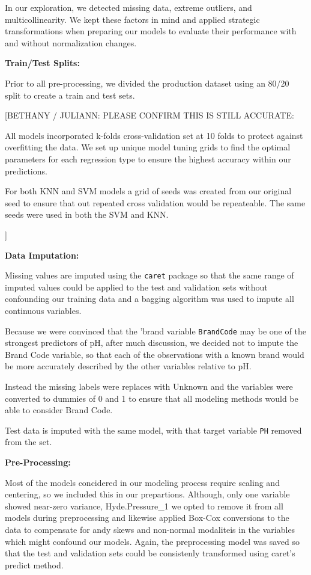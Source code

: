 \documentclass[]{report}
\begin{document}
In our exploration, we detected missing data, extreme outliers, and
multicollinearity. We kept these factors in mind and applied strategic
transformations when preparing our models to evaluate their performance
with and without normalization changes.

\textbf{Train/Test Splits:}

Prior to all pre-processing, we divided the production dataset using an
80/20 split to create a train and test sets.

{[}BETHANY / JULIANN: PLEASE CONFIRM THIS IS STILL ACCURATE:

All models incorporated k-folds cross-validation set at 10 folds to
protect against overfitting the data. We set up unique model tuning
grids to find the optimal parameters for each regression type to ensure
the highest accuracy within our predictions.

For both KNN and SVM models a grid of seeds was created from our
original seed to ensure that out repeated cross validation would be
repeateable. The same seeds were used in both the SVM and KNN.

{]}

\textbf{Data Imputation:}

Missing values are imputed using the \texttt{caret} package so that the
same range of imputed values could be applied to the test and validation
sets without confounding our training data and a bagging algorithm was
used to impute all continuous variables.

Because we were convinced that the 'brand variable \texttt{BrandCode}
may be one of the strongest predictors of pH, after much discussion, we
decided not to impute the Brand Code variable, so that each of the
observations with a known brand would be more accurately described by
the other variables relative to pH.

Instead the missing labels were replaces with Unknown and the variables
were converted to dummies of 0 and 1 to ensure that all modeling methods
would be able to consider Brand Code.

Test data is imputed with the same model, with that target variable
\texttt{PH} removed from the set.

\textbf{Pre-Processing:}

Most of the models concidered in our modeling process require scaling
and centering, so we included this in our prepartions. Although, only
one variable showed near-zero variance, Hyde.Pressure\_1 we opted to
remove it from all models during preprocessing and likewise applied
Box-Cox conversions to the data to compensate for andy skews and
non-normal modaliteis in the variables which might confound our models.
Again, the preprocessing model was saved so that the test and validation
sets could be consistenly transformed using caret's predict method.
\end{document}
